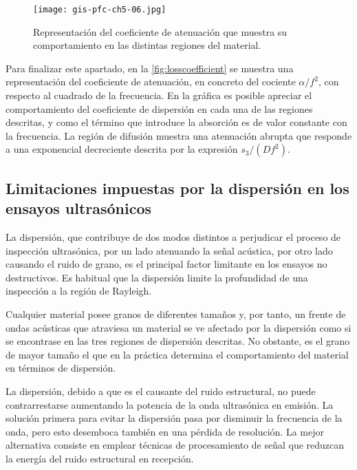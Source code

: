 \begin{figure}
	\begin{center}
		\texttt{[image: gis-pfc-ch5-06.jpg]}
	\end{center}
	\caption[Comportamiento del coeficiente de
	atenuación]{Representación del coeficiente de atenuación que
	muestra su comportamiento en las distintas regiones del material.}
	\label{fig:losscoefficient}
\end{figure}

Para finalizar este apartado, en la \vref{fig:losscoefficient} se muestra
una representación del coeficiente de atenuación, en concreto del cociente
$\alpha/f^2$, con respecto al cuadrado de la frecuencia. En la gráfica es
posible apreciar el comportamiento del coeficiente de dispersión en cada
una de las regiones descritas, y como el término que introduce la absorción
es de valor constante con la frecuencia. La región de difusión muestra una
atenuación abrupta que responde a una exponencial decreciente descrita por
la expresión $s_3/(Df^2)$.


\subsection[Limitaciones impuestas por la dispersión]{Limitaciones
impuestas por la dispersión en los ensayos ultrasónicos}

La dispersión, que contribuye de dos modos distintos a perjudicar el
proceso de inspección ultrasónica, por un lado atenuando la señal acústica,
por otro lado causando el ruido de grano, es el principal factor limitante
en los ensayos no destructivos. Es habitual que la dispersión limite la
profundidad de una inspección a la región de Rayleigh.

Cualquier material posee granos de diferentes tamaños y, por tanto, un
frente de ondas acústicas que atraviesa un material se ve afectado por la
dispersión como si se encontrase en las tres regiones de dispersión
descritas. No obstante, es el grano de mayor tamaño el que en la práctica
determina el comportamiento del material en términos de dispersión.

La dispersión, debido a que es el causante del ruido estructural, no puede
contrarrestarse aumentando la potencia de la onda ultrasónica en emisión.
La solución primera para evitar la dispersión pasa por disminuir la
frecuencia de la onda, pero esto desemboca también en una pérdida de
resolución. La mejor alternativa consiste en emplear técnicas de
procesamiento de señal que reduzcan la energía del ruido estructural en
recepción.



